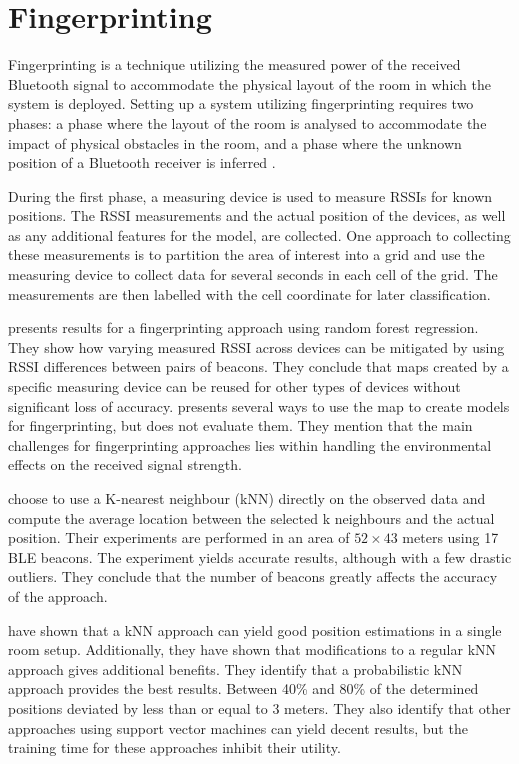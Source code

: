 \section{Fingerprinting}
Fingerprinting is a technique utilizing the measured power of the received Bluetooth signal to accommodate the physical layout of the room in which the system is deployed. 
Setting up a system utilizing fingerprinting requires two phases: a phase where the layout of the room is analysed to accommodate the impact of physical obstacles in the room, and a phase where the unknown position of a Bluetooth receiver is inferred \cite{presence_ble_review, taking_localization_to_the_wild}.

During the first phase, a measuring device is used to measure RSSIs for known positions.
The RSSI measurements and the actual position of the devices, as well as any additional features for the model, are collected. 
One approach to collecting these measurements is to partition the area of interest into a grid and use the measuring device to collect data for several seconds in each cell of the grid.\cite{improving_indoor_localization}
The measurements are then labelled with the cell coordinate for later classification.

\citeauthor{taking_localization_to_the_wild} \cite{taking_localization_to_the_wild} presents results for a fingerprinting approach using random forest regression.
They show how varying measured RSSI across devices can be mitigated by using RSSI differences between pairs of beacons.
They conclude that maps created by a specific measuring device can be reused for other types of devices without significant loss of accuracy. 
\citeauthor{presence_ble_review}\cite{presence_ble_review} presents several ways to use the map to create models for fingerprinting, but does not evaluate them.
They mention that the main challenges for fingerprinting approaches lies within handling the environmental effects on the received signal strength.

\citeauthor{improving_indoor_localization} \cite{improving_indoor_localization} choose to use a K-nearest neighbour (kNN) directly on the observed data and compute the average location between the selected k neighbours and the actual position. 
Their experiments are performed in an area of $52\times43$ meters using 17 BLE beacons.
The experiment yields accurate results, although with a few drastic outliers. 
They conclude that the number of beacons greatly affects the accuracy of the approach.

\citeauthor{ble_kneares_neural}\cite{ble_kneares_neural} have shown that a kNN approach can yield good position estimations in a single room setup. 
Additionally, they have shown that modifications to a regular kNN approach gives additional benefits. 
They identify that a probabilistic kNN approach provides the best results. 
Between 40\% and 80\% of the determined positions deviated by less than or equal to 3 meters. 
They also identify that other approaches using support vector machines can yield decent results, but the training time for these approaches inhibit their utility.

